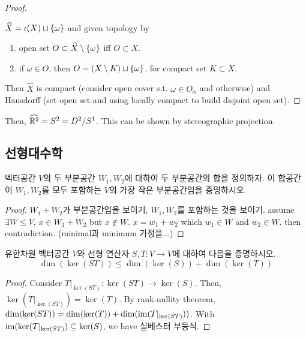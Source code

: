 \documentclass{article}
\begin{document}
\begin{proof}
    \begin{definition}
        $\widehat{X}=\iota(X) \sqcup \left\{ \omega \right\}$ and given topology by
        \begin{enumerate}[label=\roman*)]
            \item open set $O \subset \widehat{X}\setminus\left\{ \omega \right\}$ iff $O \subset X$.
            \item if $\omega \in O$, then $O=(X \setminus K) \sqcup \left\{ \omega \right\}$, for compact set $K \subset X$.
        \end{enumerate}
    \end{definition}

    Then $\widehat{X}$ is compact (consider open cover s.t. $\omega \in O_\alpha$ and otherwise) and Hausdorff (set open set and using locally compact to build disjoint open set).
\end{proof}

Then, $\widehat{\mathbb{R}^2} = S^2 = D^2/{S^1}$. This can be shown by stereographic projection.

\subsection{선형대수학}

\begin{proposition}
    벡터공간 $V$의 두 부분공간 $W_1, W_2$에 대하여 두 부분공간의 합을 정의하자. 이 합공간이 $W_1, W_2$를 모두 포함하는 $V$의 가장 작은 부분공간임을 증명하시오.
\end{proposition}

\begin{proof}
    $W_1+W_2$가 부분공간임을 보이기, $W_1, W_2$를 포함하는 것을 보이기.
    assume $\exists W \leq V$, $x \in W_1 + W_2$ but $x \not\in W$. $x=w_1+w_2$ which $w_1 \in W$ and $w_2 \in W$. then contradiction. (minimal과 minimum 가정을...)
\end{proof}

\begin{proposition}
    유한차원 벡터공간 $V$와 선형 연산자 $S, T : V \to V$에 대하여 다음을 증명하시오.
    \[
        \dim(\ker(ST)) \leq \dim(\ker(S)) + \dim(\ker(T))
    \]
\end{proposition}

\begin{proof}
    Consider $T|_{\ker(ST)}: \ker(ST) \to \ker(S)$. Then, $\ker(T|_{\ker(ST)})=\ker(T)$. By rank-nullity theorem, $\dim(\ker(ST))=\dim(\ker(T))+\dim(\operatorname{im}(T|_{\ker(ST)}))$. With $\operatorname{im}(\ker(T|_{\ker(ST)}) \subseteq \ker(S)$, we have 실베스터 부등식.
\end{proof}
\end{document}

